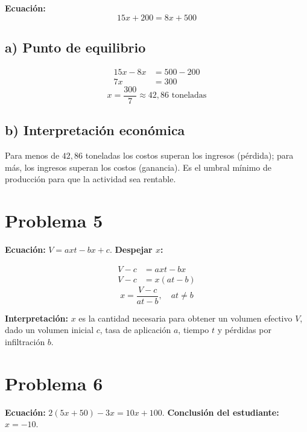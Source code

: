 \documentclass[12pt]{article}
\begin{document}
	\textbf{Ecuación:}
	\[
	15x + 200 = 8x + 500
	\]
	
	\subsection*{a) Punto de equilibrio}
	
	\begin{align*}
		15x - 8x &= 500 - 200 \\
		7x       &= 300
	\end{align*}
	\[
	\boxed{x = \frac{300}{7} \approx 42{,}86 \text{ toneladas}}
	\]
	
	\subsection*{b) Interpretación económica}
	
	Para menos de $42{,}86$ toneladas los costos superan los ingresos (pérdida);
	para más, los ingresos superan los costos (ganancia). Es el umbral mínimo de
	producción para que la actividad sea rentable.
	
	\bigskip
	
	\section*{Problema 5}
	
	\textbf{Ecuación:} $V = axt - bx + c$. \textbf{Despejar $x$:}
	
	\begin{align*}
		V - c     &= axt - bx \\
		V - c     &= x(at - b)
	\end{align*}
	\[
	\boxed{x = \frac{V - c}{at - b}, \quad at \neq b}
	\]
	
	\textbf{Interpretación:} $x$ es la cantidad necesaria para obtener un volumen
	efectivo $V$, dado un volumen inicial $c$, tasa de aplicación $a$, tiempo $t$
	y pérdidas por infiltración $b$.
	
	\bigskip
	
	\section*{Problema 6}
	
	\textbf{Ecuación:} $2(5x + 50) - 3x = 10x + 100$. \quad
	\textbf{Conclusión del estudiante:} $x = -10$.
	
\end{document}
